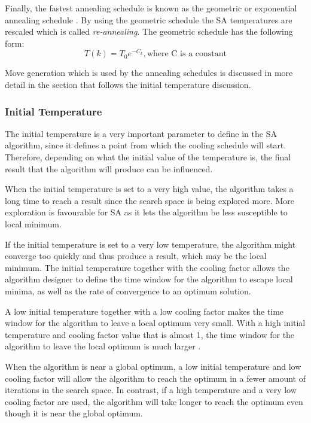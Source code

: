 Finally, the fastest annealing schedule is known as the geometric or exponential annealing schedule \cite{SASingleMultiObj}. By using the geometric schedule the \gls{SA} temperatures are rescaled which is called \emph{re-annealing}\cite{VeryFastSAImageEnchancement}.
The geometric schedule has the following form:
\begin{equation}
\label{eq:geocooling}
	T(k)=T_0e^{-C_k},\text{where C is a constant}
\end{equation}

Move generation which is used by the annealing schedules is discussed in more detail in the section that follows the initial temperature discussion.

\subsubsection{Initial Temperature}
The initial temperature is a very important parameter to define in the \gls{SA} algorithm, since it defines a point from which the cooling schedule will start\cite{VariousCoolingSA}. Therefore, depending on what the initial value of the temperature is, the final result that the algorithm will produce can be influenced\cite{SALongestCommon,AutoConfigSA}.

When the initial temperature is set to a very high value, the algorithm takes a long time to reach a result since the search space is being explored more\cite{SALongestCommon,VariousCoolingSA}. More exploration is favourable for \gls{SA} as it lets the algorithm be less susceptible to local minimum. 

If the initial temperature is set to a very low temperature, the algorithm might converge too quickly and thus produce a result, which may be the local minimum\cite{SALongestCommon,VariousCoolingSA,AutoConfigSA}.
The initial temperature together with the cooling factor allows the algorithm designer to define the time window for the algorithm to escape local minima, as well as the rate of convergence to an optimum solution\cite{SALongestCommon,VariousCoolingSA}.

A low initial temperature together with a low cooling factor makes the time window for the algorithm to leave a local optimum very small\cite{SALongestCommon}. With a high initial temperature and cooling factor value that is almost 1, the time window for the algorithm to leave the local optimum is much larger \cite{SALongestCommon}. 

When the algorithm is near a global optimum, a low initial temperature and low cooling factor will allow the algorithm to reach the optimum in a fewer amount of iterations in the search space\cite{SALongestCommon}. In contrast, if a high temperature and a very low cooling factor are used, the algorithm will take longer to reach the optimum even though it is near the global optimum\cite{SALongestCommon}.


